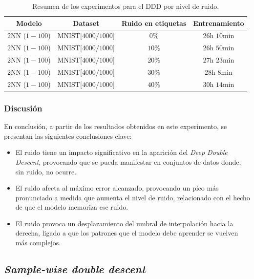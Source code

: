 \begin{table}[h!]
    \centering
    \begin{tabular}{|c|c|c|c|}
    \hline
    \textbf{Modelo}       & \textbf{Dataset} & \textbf{Ruido en etiquetas} & \textbf{Entrenamiento} \\ 
    \hline
    $2$NN ($1-100$)          & MNIST[$4000/1000$]        & $0\%$       & $26$h $10$min       \\ 
    $2$NN ($1-100$)          & MNIST[$4000/1000$]        & $10\%$         & $26$h $50$min       \\ 
    $2$NN ($1-100$)          & MNIST[$4000/1000$]        & $20\%$         & $27$h $23$min       \\ 
    $2$NN ($1-100$)          & MNIST[$4000/1000$]        & $30\%$          & $28$h $8$min       \\ 
    $2$NN ($1-100$)          & MNIST[$4000/1000$]       & $40\%$          & $30$h $14$min       \\  
    \hline
    \end{tabular}
    \caption[Resumen de los experimentos para el DDD por nivel de ruido.]{Resumen de los experimentos para el DDD por nivel de ruido.}
    \label{tab:noisewisedd}
\end{table}

\subsubsection{Discusión}\label{subsubsec:discusion-ruido}

En conclusión, a partir de los resultados obtenidos en este experimento, se presentan las siguientes conclusiones clave:

\begin{itemize}
    \item El ruido tiene un impacto significativo en la aparición del \textit{Deep Double Descent}, provocando que se pueda manifestar en conjuntos de datos donde, sin ruido, no ocurre.
    \item El ruido afecta al máximo error alcanzado, provocando un pico más pronunciado a medida que aumenta el nivel de ruido, relacionado con el hecho de que el modelo memoriza ese ruido.
    \item El ruido provoca un desplazamiento del umbral de interpolación hacia la derecha, ligado a que los patrones que el modelo debe aprender se vuelven más complejos.
\end{itemize}

\subsection{\textit{Sample-wise double descent}}\label{subsec:sample-wise-dd}

